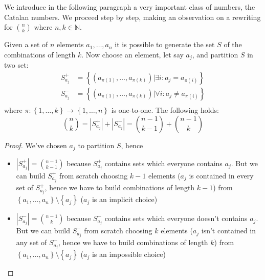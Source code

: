 We introduce in the following paragraph a very important class of
numbers, the Catalan numbers. We proceed step by step, making an
observation on a rewriting for ${{n}\choose{k}}$ where $n,k\in
\mathbb{N} $.

Given a set of $n$ elements $a_1, \ldots,a_n$ it is possible to
generate the set $S$ of the combinations of length $k$. Now choose an
element, let say $a_j$, and partition $S$ in two set:
\begin{displaymath}
  \begin{split}
    S_{a_j}^+ &= \left \lbrace (a_{\pi(1)}, \ldots, a_{\pi(k)}) |
      \exists i: a_j = a_{\pi(i)} \right\rbrace \\
    S_{a_j}^- &= \left \lbrace (a_{\pi(1)}, \ldots, a_{\pi(k)}) |
      \forall i: a_j \not = a_{\pi(i)} \right\rbrace \\    
  \end{split}
\end{displaymath}
where $\pi: \left \lbrace 1, \ldots, k \right\rbrace \rightarrow \left
  \lbrace 1, \ldots, n \right\rbrace $ is one-to-one. The following
holds:
\begin{displaymath}
  {{n}\choose{k}} = \left| S_{a_j}^+ \right| + \left| S_{a_j}^-
  \right| = {{n-1}\choose{k-1}} +  {{n-1}\choose{k}}
\end{displaymath}
\begin{proof}
  We've chosen $a_j$ to partition $S$, hence
  \begin{itemize}
  \item $\left| S_{a_j}^+ \right| = {{n-1}\choose{k-1}}$ because
    $S_{a_j}^+$ contains sets which everyone contains $a_j$. But we
    can build $ S_{a_j}^+$ from scratch choosing $k-1$ elements ($a_j$
    is contained in every set of $S_{a_j}^+$, hence we have to build
    combinations of length $k-1$) from $\left \lbrace a_1, \ldots, a_n
    \right\rbrace \setminus \left \lbrace a_j \right\rbrace $ ($a_j$
    is an implicit choice)
  \item $\left| S_{a_j}^- \right| = {{n-1}\choose{k}}$ because $
    S_{a_j}^-$ contains sets which everyone doesn't contains
    $a_j$. But we can build $ S_{a_j}^- $ from scratch choosing $k$
    elements ($a_j$ isn't contained in any set of $S_{a_j}^-$, hence
    we have to build combinations of length $k$) from $\left \lbrace
      a_1, \ldots, a_n \right\rbrace \setminus \left \lbrace a_j
    \right\rbrace $ ($a_j$ is an impossible choice)
  \end{itemize}
\end{proof}

